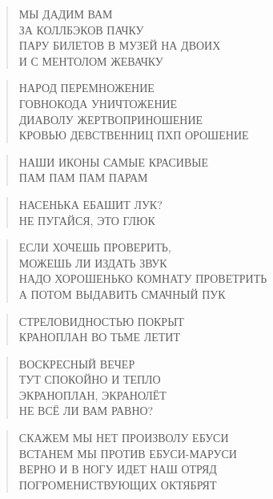 \poemtitle{***}
\begin{verse}
МЫ ДАДИМ ВАМ\\
ЗА КОЛЛБЭКОВ ПАЧКУ\\
ПАРУ БИЛЕТОВ В МУЗЕЙ НА ДВОИХ\\
И С МЕНТОЛОМ ЖЕВАЧКУ
\end{verse}

\poemtitle{***}
\begin{verse}
НАРОД ПЕРЕМНОЖЕНИЕ\\
ГОВНОКОДА УНИЧТОЖЕНИЕ\\
ДИАВОЛУ ЖЕРТВОПРИНОШЕНИЕ\\
КРОВЬЮ ДЕВСТВЕННИЦ ПХП ОРОШЕНИЕ
\end{verse}

\poemtitle{***}
\begin{verse}
НАШИ ИКОНЫ САМЫЕ КРАСИВЫЕ\\
ПАМ ПАМ ПАМ ПАРАМ
\end{verse}

\poemtitle{***}
\begin{verse}
НАСЕНЬКА ЕБАШИТ ЛУК?\\
НЕ ПУГАЙСЯ, ЭТО ГЛЮК
\end{verse}

\poemtitle{***}
\begin{verse}
ЕСЛИ ХОЧЕШЬ ПРОВЕРИТЬ, \\
МОЖЕШЬ ЛИ ИЗДАТЬ ЗВУК\\
НАДО ХОРОШЕНЬКО КОМНАТУ ПРОВЕТРИТЬ\\
А ПОТОМ ВЫДАВИТЬ СМАЧНЫЙ ПУК
\end{verse}

\poemtitle{***}
\begin{verse}
СТРЕЛОВИДНОСТЬЮ ПОКРЫТ\\
КРАНОПЛАН ВО ТЬМЕ ЛЕТИТ
\end{verse}

\poemtitle{***}
\begin{verse}
ВОСКРЕСНЫЙ ВЕЧЕР\\
ТУТ СПОКОЙНО И ТЕПЛО\\
ЭКРАНОПЛАН, ЭКРАНОЛЁТ\\
НЕ ВСЁ ЛИ ВАМ РАВНО?
\end{verse}

\poemtitle{***}
\begin{verse}
СКАЖЕМ МЫ НЕТ ПРОИЗВОЛУ ЕБУСИ\\
ВСТАНЕМ МЫ ПРОТИВ ЕБУСИ-МАРУСИ\\
ВЕРНО И В НОГУ ИДЕТ НАШ ОТРЯД\\
ПОГРОМЕНИСТВУЮЩИХ ОКТЯБРЯТ
\end{verse}

